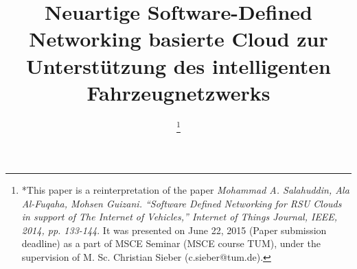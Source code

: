 \documentclass[conference]{IEEEtran}
\begin{document}
%
\title{Neuartige Software-Defined Networking basierte Cloud zur Unterstützung des intelligenten Fahrzeugnetzwerks}
%


\author{

\thanks{*This paper is a reinterpretation of the paper \emph{Mohammad A. Salahuddin, Ala Al-Fuqaha, Mohsen Guizani. ``Software Defined Networking for RSU Clouds in support of The Internet of Vehicles,'' Internet of Things Journal, IEEE, 2014, pp. 133-144}. It was presented on June 22, 2015 (Paper submission deadline) as a part of MSCE Seminar (MSCE course TUM), under the supervision of M. Sc. 
Christian Sieber (c.sieber@tum.de).}
}


% 
\end{document}
